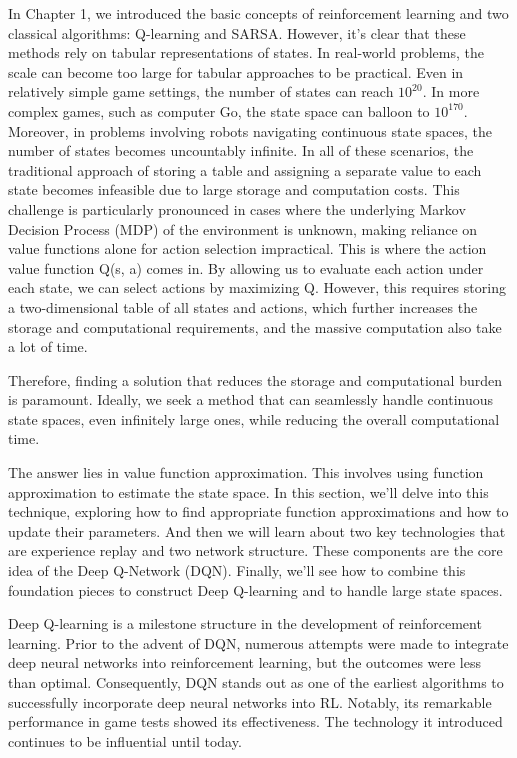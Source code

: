 \documentclass{article}
\begin{document}
In Chapter 1, we introduced the basic concepts of reinforcement learning and two classical algorithms: Q-learning and SARSA. However, it's clear that these methods rely on tabular representations of states. In real-world problems, the scale can become too large for tabular approaches to be practical. Even in relatively simple game settings, the number of states can reach $10^{20}$. In more complex games, such as computer Go, the state space can balloon to $10^{170}$. Moreover, in problems involving robots navigating continuous state spaces, the number of states becomes uncountably infinite. In all of these scenarios, the traditional approach of storing a table and assigning a separate value to each state becomes infeasible due to large storage and computation costs. This challenge is particularly pronounced in cases where the underlying Markov Decision Process (MDP) of the environment is unknown, making reliance on value functions alone for action selection impractical. This is where the action value function Q(s, a) comes in. By allowing us to evaluate each action under each state, we can select actions by maximizing Q. However, this requires storing a two-dimensional table of all states and actions, which further increases the storage and computational requirements,  and the massive computation also take a lot of time.

Therefore, finding a solution that reduces the storage and computational burden is paramount. Ideally, we seek a method that can seamlessly handle continuous state spaces, even infinitely large ones, while reducing the overall computational time.

The answer lies in value function approximation. This involves using function approximation to estimate the state space. In this section, we'll delve into this technique, exploring how to find appropriate function approximations and how to update their parameters. And then we will learn about two key technologies that are experience replay and two network structure. These components are the core idea of the Deep Q-Network (DQN). Finally, we'll see how to combine this foundation pieces to construct Deep Q-learning and to handle large state spaces.

Deep Q-learning is a milestone structure in the development of reinforcement learning. Prior to the advent of DQN, numerous attempts were made to integrate deep neural networks into reinforcement learning, but the outcomes were less than optimal. Consequently, DQN stands out as one of the earliest algorithms to successfully incorporate deep neural networks into RL. Notably, its remarkable performance in game tests showed its effectiveness. The technology it introduced continues to be influential until today.
\end{document}
